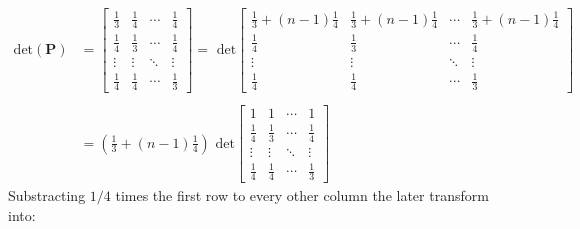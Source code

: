 \documentclass{exam}
\begin{document}
\begin{equation*}
    \begin{aligned}
        \displaystyle \text{det}(\pmb{\text{P}}) &=  \displaystyle\begin{bmatrix}
            \frac{1}{3} & \frac{1}{4}  & \cdots & \frac{1}{4} \\[1.2em]
            \frac{1}{4}  & \frac{1}{3}  & \cdots & \frac{1}{4} \\
            \vdots  & \vdots  & \ddots & \vdots  \\
            \frac{1}{4}  & \frac{1}{4}  & \cdots & \frac{1}{3} 
          \end{bmatrix}
         = \text{ det}\displaystyle\begin{bmatrix}
             \frac{1}{3} + (n-1)\frac{1}{4}&  \frac{1}{3} + (n-1)\frac{1}{4}  & \cdots & \frac{1}{3} + (n-1)\frac{1}{4}\\[1.2em]
             \frac{1}{4}  & \frac{1}{3}  & \cdots & \frac{1}{4} \\
             \vdots  & \vdots  & \ddots & \vdots  \\
             \frac{1}{4}  & \frac{1}{4}  & \cdots & \frac{1}{3} 
            \end{bmatrix}\\
         \\
         &= (\frac{1}{3} + (n-1)\frac{1}{4})\text{ det}\begin{bmatrix}
             1 & 1 & \cdots & 1\\[1.2em]
            \frac{1}{4}  & \frac{1}{3}  & \cdots & \frac{1}{4} \\
            \vdots  & \vdots  & \ddots & \vdots  \\
            \frac{1}{4}  & \frac{1}{4}  & \cdots & \frac{1}{3} 
           \end{bmatrix}
    \end{aligned}    
\end{equation*}
Substracting $1/4$ times the first row to every other column the later transform into: 
\end{document}
